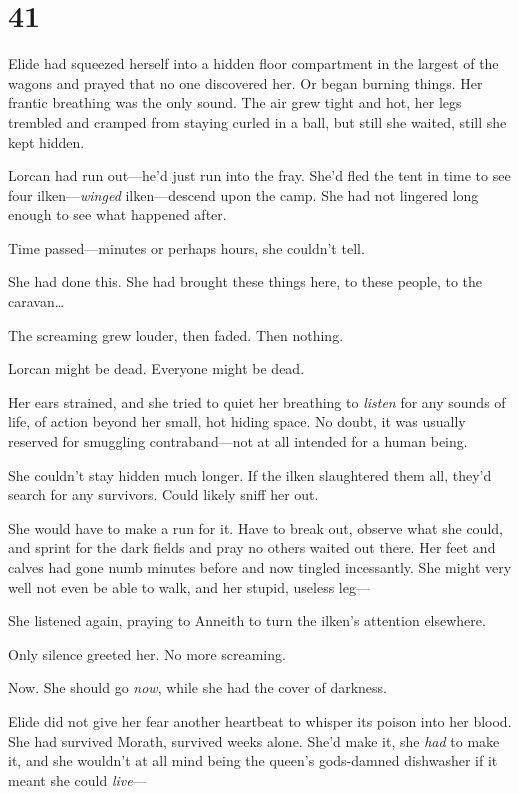 
\chapter{41}

Elide had squeezed herself into a hidden floor compartment in the largest of the wagons and prayed that no one discovered her.
Or began burning things.
Her frantic breathing was the only sound.
The air grew tight and hot, her legs trembled and cramped from staying curled in a ball, but still she waited, still she kept hidden.

Lorcan had run out---he'd just run into the fray.
She'd fled the tent in time to see four ilken---\emph{winged} ilken---descend upon the camp.
She had not lingered long enough to see what happened after.

Time passed---minutes or perhaps hours, she couldn't tell.

She had done this.
She had brought these things here, to these people, to the caravan\ldots{}

The screaming grew louder, then faded.
Then nothing.

Lorcan might be dead.
Everyone might be dead.

Her ears strained, and she tried to quiet her breathing to \emph{listen}
for any sounds of life, of action beyond her small, hot hiding space.
No doubt, it was usually reserved for smuggling contraband---not at all intended for a human being.

She couldn't stay hidden much longer.
If the ilken slaughtered them all, they'd search for any survivors.
Could likely sniff her out.

She would have to make a run for it.
Have to break out, observe what she could, and sprint for the dark fields and pray no others waited out there.
Her feet and calves had gone numb minutes before and now tingled incessantly.
She might very well not even be able to walk, and her stupid, useless leg---

She listened again, praying to Anneith to turn the ilken's attention elsewhere.

Only silence greeted her.
No more screaming.

Now.
She should go \emph{now}, while she had the cover of darkness.

Elide did not give her fear another heartbeat to whisper its poison into her blood.
She had survived Morath, survived weeks alone.
She'd make it, she \emph{had} to make it, and she wouldn't at all mind being the queen's gods-damned dishwasher if it meant she could \emph{live}---

